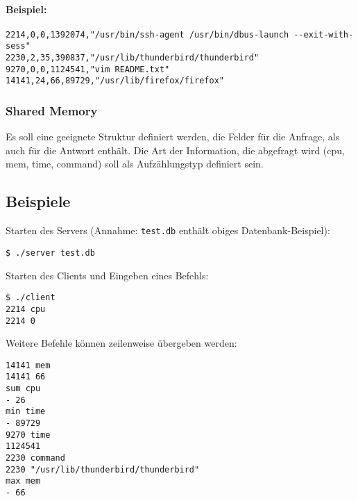 \paragraph{Beispiel:}

\begin{verbatim}
2214,0,0,1392074,"/usr/bin/ssh-agent /usr/bin/dbus-launch --exit-with-sess"
2230,2,35,390837,"/usr/lib/thunderbird/thunderbird"
9270,0,0,1124541,"vim README.txt"
14141,24,66,89729,"/usr/lib/firefox/firefox"
\end{verbatim}



\subsubsection*{Shared Memory}

Es soll eine geeignete Struktur definiert werden, die Felder für die Anfrage,
als auch für die Antwort enthält. Die Art der Information, die abgefragt wird
(cpu, mem, time, command) soll als Aufzählungstyp definiert sein.


\subsection*{Beispiele}

Starten des Servers (Annahme: \texttt{test.db} enthält obiges
Datenbank-Beispiel):
%
\begin{verbatim}
$ ./server test.db
\end{verbatim}
%
Starten des Clients und Eingeben eines Befehls:
%
\begin{verbatim}
$ ./client
2214 cpu
2214 0
\end{verbatim}
%
Weitere Befehle können zeilenweise übergeben werden:
%
\begin{verbatim}
14141 mem
14141 66
sum cpu
- 26
min time
- 89729
9270 time
1124541
2230 command
2230 "/usr/lib/thunderbird/thunderbird"
max mem
- 66
\end{verbatim}

\osueguidelinesthree


